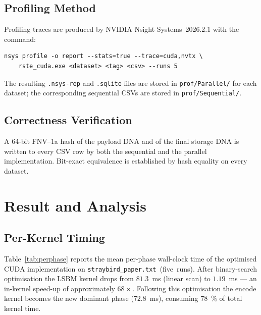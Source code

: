 \documentclass[runningheads]{llncs}
\begin{document}
\subsection{Profiling Method}
Profiling traces are produced by NVIDIA Nsight Systems~2026.2.1 with
the command:
\begin{lstlisting}[style=cudastyle]
nsys profile -o report --stats=true --trace=cuda,nvtx \
    rste_cuda.exe <dataset> <tag> <csv> --runs 5
\end{lstlisting}
The resulting \texttt{.nsys-rep} and \texttt{.sqlite} files are stored
in \texttt{prof/Parallel/} for each dataset; the corresponding
sequential CSVs are stored in \texttt{prof/Sequential/}.

\subsection{Correctness Verification}
A 64-bit FNV--1a hash of the payload DNA and of the final storage DNA is
written to every CSV row by both the sequential and the parallel
implementation.  Bit-exact equivalence is established by hash equality
on every dataset.

\section{Result and Analysis}
\label{sec:result}

\subsection{Per-Kernel Timing}
Table~\ref{tab:perphase} reports the mean per-phase wall-clock time
of the optimised CUDA implementation on
\texttt{straybird\_paper.txt}~(five~runs).  After binary-search
optimisation the LSBM kernel drops from $81.3$~ms (linear scan) to
$1.19$~ms --- an in-kernel speed-up of approximately $68\times$.
Following this optimisation the encode kernel becomes the new dominant
phase ($72.8$~ms), consuming 78~\% of total kernel time.
\end{document}
